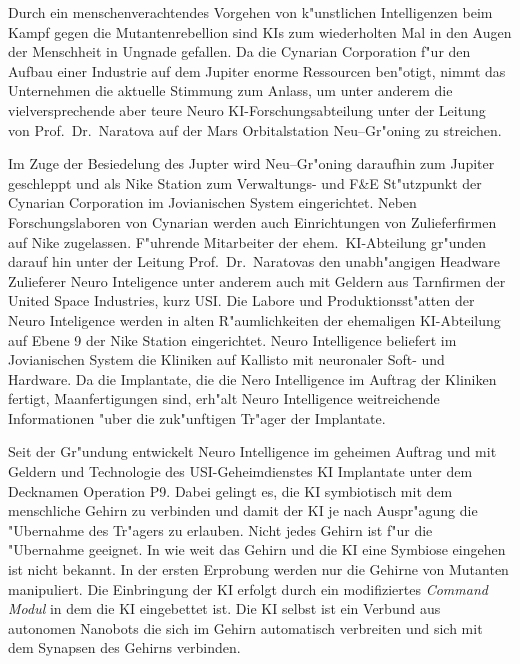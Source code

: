 

Durch ein menschenverachtendes Vorgehen von k"unstlichen Intelligenzen beim Kampf gegen die Mutantenrebellion sind KIs zum wiederholten Mal in den Augen der Menschheit in Ungnade gefallen. Da die Cynarian Corporation f"ur den Aufbau einer Industrie auf dem Jupiter enorme Ressourcen ben"otigt, nimmt das Unternehmen die aktuelle Stimmung zum Anlass, um unter anderem die vielversprechende aber teure Neuro KI-Forschungsabteilung unter der Leitung von Prof.~Dr.~Naratova auf der Mars Orbitalstation Neu--Gr"oning zu streichen.

Im Zuge der Besiedelung des Jupter wird Neu--Gr"oning daraufhin zum Jupiter geschleppt und als Nike Station zum Verwaltungs- und F\&E St"utzpunkt der Cynarian Corporation im Jovianischen System eingerichtet. Neben Forschungslaboren von Cynarian werden auch Einrichtungen von Zulieferfirmen auf Nike zugelassen. F"uhrende Mitarbeiter der ehem.~KI-Abteilung gr"unden darauf hin unter der Leitung Prof.~Dr.~Naratovas den unabh"angigen Headware Zulieferer Neuro Inteligence unter anderem auch mit Geldern aus Tarnfirmen der United Space Industries, kurz USI. Die Labore und Produktionsst"atten der Neuro Inteligence werden in alten R"aumlichkeiten der ehemaligen KI-Abteilung auf Ebene 9 der Nike Station eingerichtet. Neuro Intelligence beliefert im Jovianischen System die Kliniken auf Kallisto mit neuronaler Soft- und Hardware. Da die Implantate, die die Nero Intelligence im Auftrag der Kliniken fertigt, Ma\3anfertigungen sind, erh"alt Neuro Intelligence weitreichende Informationen "uber die zuk"unftigen Tr"ager der Implantate.

Seit der Gr"undung entwickelt Neuro Intelligence im geheimen Auftrag und mit Geldern und Technologie des USI-Geheimdienstes KI Implantate unter dem Decknamen Operation P9. Dabei gelingt es, die KI symbiotisch mit dem menschliche Gehirn zu verbinden und damit der KI je nach Auspr"agung die "Ubernahme des Tr"agers zu erlauben. Nicht jedes Gehirn ist f"ur die "Ubernahme geeignet. In wie weit das Gehirn und die KI eine Symbiose eingehen ist nicht bekannt. In der ersten Erprobung werden nur die Gehirne von Mutanten manipuliert. Die Einbringung der KI erfolgt durch ein modifiziertes \emph{Command Modul} in dem die KI eingebettet ist. Die KI selbst ist ein Verbund aus autonomen Nanobots die sich im Gehirn automatisch verbreiten und sich mit dem Synapsen des Gehirns verbinden.

